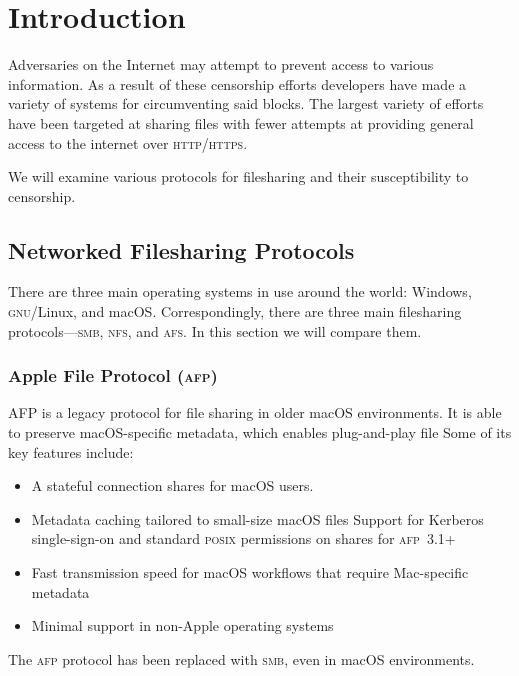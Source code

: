 \section{Introduction}\label{sec:intro}

Adversaries on the Internet may attempt to prevent access to various
information. As a result of these censorship efforts developers have made a
variety of systems for circumventing said blocks. The largest variety of efforts
have been targeted at sharing files with fewer attempts at providing general
access to the internet over \textsc{http}/\textsc{https}.

We will examine various protocols for filesharing and their susceptibility to
censorship.

\subsection{Networked Filesharing Protocols}

There are three main operating systems in use around the world: Windows,
\textsc{gnu}/Linux, and macOS. Correspondingly, there are three main filesharing
protocols---\textsc{smb}, \textsc{nfs}, and \textsc{afs}. In this section we will
compare them.

\subsubsection{Apple File Protocol (\textsc{afp})}

AFP is a legacy protocol for file sharing in older macOS environments. It is
able to preserve macOS-specific metadata, which enables plug-and-play file
Some of its key features include\cite{eriksenCOMPARISONNFSSAMBA}:
\begin{itemize}[nosep]
      \item A stateful connection shares for macOS users.
      \item Metadata caching tailored to small-size macOS files Support for
            Kerberos single-sign-on and standard \textsc{posix} permissions on
            shares for \textsc{afp}~3.1+
      \item Fast transmission speed for macOS workflows that require Mac-specific
            metadata
      \item Minimal support in non-Apple operating systems
\end{itemize}
The \textsc{afp} protocol has been replaced with \textsc{smb}, even in macOS
environments.

